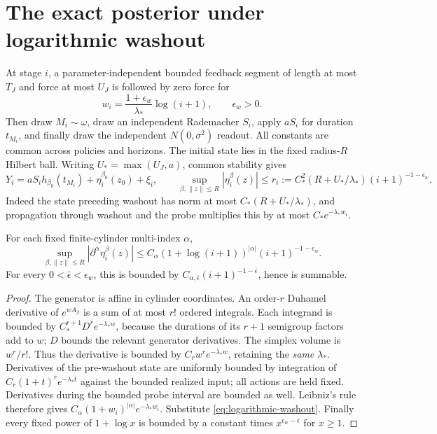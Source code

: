 \section{The exact posterior under logarithmic washout}
\label{sec:jacobi-statistics}
At stage \(i\), a parameter-independent bounded feedback segment of
length at most \(T_J\) and force at most \(U_J\) is followed by zero force
for
\begin{equation}
 w_i=\frac{1+\epsilon_w}{\lambda_*}\log(i+1),\qquad \epsilon_w>0.
 \label{eq:logarithmic-washout}
\end{equation}
Then draw \(M_i\sim\omega\), draw an independent Rademacher \(S_i\),
apply \(aS_i\) for duration \(t_{M_i}\), and finally draw the independent
\(N(0,\sigma^2)\) readout. All constants are common across policies and
horizons. The initial state lies in the fixed radius-\(R\) Hilbert ball.
Writing \(U_*=\max(U_J,a)\), common stability gives
\begin{equation}
 Y_i=aS_ih_{\beta_0}(t_{M_i})+\eta_i^{\beta_0}(z_0)+\xi_i,
 \qquad \sup_{\beta,\|z\|\le R}|\eta_i^\beta(z)|
 \le r_i:=C_*^2(R+U_*/\lambda_*)(i+1)^{-1-\epsilon_w}.
 \label{eq:washed-observation}
\end{equation}
Indeed the state preceding washout has norm at most
\(C_*(R+U_*/\lambda_*)\), and propagation through washout and the probe
multiplies this by at most \(C_*e^{-\lambda_*w_i}\).

\begin{lemma}
\label{lem:washout-derivatives}
For each fixed finite-cylinder multi-index \(\alpha\),
\begin{equation}
 \sup_{\beta,\|z\|\le R}|\partial^\alpha\eta_i^\beta(z)|
 \le C_\alpha(1+\log(i+1))^{|\alpha|}(i+1)^{-1-\epsilon_w}.
 \label{eq:polynomial-washout-envelope}
\end{equation}
For every \(0<\bar\epsilon<\epsilon_w\), this is bounded by
\(C_{\alpha,\bar\epsilon}(i+1)^{-1-\bar\epsilon}\), hence is summable.
\end{lemma}
\begin{proof}
The generator is affine in cylinder coordinates. An order-\(r\)
Duhamel derivative of \(e^{wA_\beta}\) is a sum of at most \(r!\)
ordered integrals. Each integrand is bounded by
\(C_*^{r+1}D^re^{-\lambda_*w}\), because the durations of its \(r+1\)
semigroup factors add to \(w\); \(D\) bounds the relevant generator
derivatives. The simplex volume is \(w^r/r!\). Thus the derivative is
bounded by \(C_r w^re^{-\lambda_*w}\), retaining the \emph{same}
\(\lambda_*\). Derivatives of the pre-washout state are uniformly
bounded by integration of \(C_r(1+t)^re^{-\lambda_*t}\) against the
bounded realized input; all actions are held fixed. Derivatives during
the bounded probe interval are bounded as well. Leibniz's rule therefore
gives \(C_\alpha(1+w_i)^{|\alpha|}e^{-\lambda_*w_i}\).
Substitute \eqref{eq:logarithmic-washout}. Finally every fixed power of
\(1+\log x\) is bounded by a constant times
\(x^{\epsilon_w-\bar\epsilon}\) for \(x\ge1\).
\end{proof}

